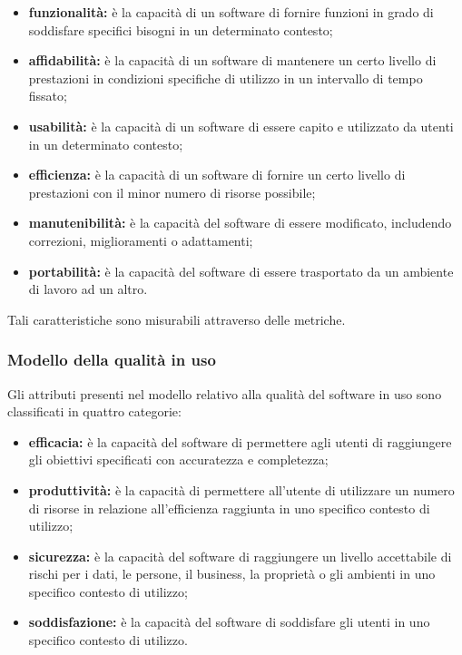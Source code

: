 \documentclass[PianoDiQualifica.tex]{subfiles}
\begin{document}
\begin{itemize}
\item \textbf{funzionalità:} è la capacità di un software di fornire funzioni in grado di soddisfare specifici bisogni in un determinato contesto;
\item \textbf{affidabilità:} è la capacità di un software di mantenere un certo livello di prestazioni in condizioni specifiche di utilizzo in un intervallo di tempo fissato;
\item \textbf{usabilità:} è la capacità di un software di essere capito e utilizzato da utenti in un determinato contesto;
\item \textbf{efficienza:} è la capacità di un software di fornire un certo livello di prestazioni con il minor numero di risorse possibile;
\item \textbf{manutenibilità:} è la capacità del software di essere modificato, includendo correzioni, miglioramenti o adattamenti;
\item \textbf{portabilità:} è la capacità del software di essere trasportato da un ambiente di lavoro ad un altro.
\end{itemize}

Tali caratteristiche sono misurabili attraverso delle metriche.

\subsubsection{Modello della qualità in uso}
Gli attributi presenti nel modello relativo alla qualità del software in uso
sono classificati in quattro categorie:

\begin{itemize}
\item \textbf{efficacia:} è la capacità del software di permettere agli utenti di raggiungere gli obiettivi specificati con accuratezza e completezza;
\item \textbf{produttività:} è la capacità di permettere all’utente di utilizzare un numero di risorse in relazione all’efficienza raggiunta in uno specifico contesto di utilizzo;
\item \textbf{sicurezza:} è la capacità del software di raggiungere un livello accettabile di rischi  per i dati, le persone, il business, la proprietà o gli ambienti in uno specifico contesto di utilizzo;
\item \textbf{soddisfazione:} è la capacità del software di soddisfare gli utenti in uno specifico contesto di utilizzo.
\end{itemize}
\end{document}
